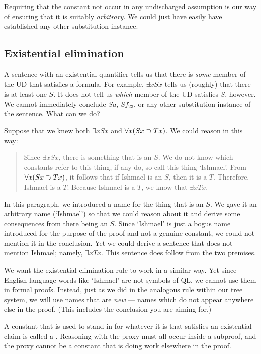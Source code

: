 Requiring that the constant not occur in any undischarged assumption is our way of ensuring that it is suitably \emph{arbitrary}. We could just have easily have established any other substitution instance.

\subsection{Existential elimination}
A sentence with an existential quantifier tells us that there is \emph{some} member of the UD that satisfies a formula. For example, $\exists x Sx$ tells us (roughly) that there is at least one $S$. It does not tell us \emph{which} member of the UD satisfies $S$, however. We cannot immediately conclude $Sa$, $Sf_{23}$, or any other substitution instance of the sentence. What can we do?

Suppose that we knew both $\exists x Sx$ and $\forall x(Sx \supset Tx)$. We could reason in this way:
\begin{quote}
Since $\exists x Sx$, there is something that is an $S$. We do not know which constants refer to this thing, if any do, so call this thing `Ishmael'. From $\forall x(Sx \supset Tx)$, it follows that if Ishmael is an $S$, then it is a $T$. Therefore, Ishmael is a $T$.  Because Ishmael is a $T$, we know that $\exists x Tx$.
\end{quote}
In this paragraph, we introduced a name for the thing that is an $S$. We gave it an arbitrary name (`Ishmael') so that we could reason about it and derive some consequences from there being an $S$. Since `Ishmael' is just a bogus name introduced for the purpose of the proof and not a genuine constant, we could not mention it in the conclusion. Yet we could derive a sentence that does not mention Ishmael; namely, $\exists x Tx$. This sentence does follow from the two premises.

We want the existential elimination rule to work in a similar way. Yet since English language words like `Ishmael' are not symbols of QL, we cannot use them in formal proofs. Instead, just as we did in the analogous rule within our tree system, we will use names that are \emph{new} --- names which do not appear anywhere else in the proof. (This includes the conclusion you are aiming for.)

A constant that is used to stand in for whatever it is that satisfies an existential claim is called a . Reasoning with the proxy must all occur inside a subproof, and the proxy cannot be a constant that is doing work elsewhere in the proof.

